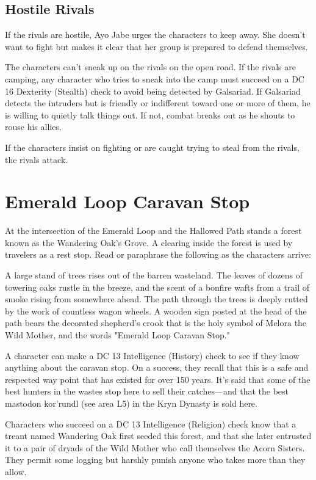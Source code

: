 \documentclass[10pt,a4paper,twoside,bg=print,twocolumn,openany,nodeprecatedcode]{dndbook}
\begin{document}
\subsection{Hostile Rivals}
If the rivals are hostile, Ayo Jabe urges the characters to keep away. She doesn't want to fight but makes it clear that her group is prepared to defend themselves.

The characters can't sneak up on the rivals on the open road. If the rivals are camping, any character who tries to sneak into the camp must succeed on a DC 16 Dexterity (Stealth) check to avoid being detected by Galsariad. If Galsariad detects the intruders but is friendly or indifferent toward one or more of them, he is willing to quietly talk things out. If not, combat breaks out as he shouts to rouse his allies.

If the characters insist on fighting or are caught trying to steal from the rivals, the rivals attack.

\section{Emerald Loop Caravan Stop}
At the intersection of the Emerald Loop and the Hallowed Path stands a forest known as the Wandering Oak's Grove. A clearing inside the forest is used by travelers as a rest stop. Read or paraphrase the following as the characters arrive:

\begin{DndReadAloud}{}
A large stand of trees rises out of the barren wasteland. The leaves of dozens of towering oaks rustle in the breeze, and the scent of a bonfire wafts from a trail of smoke rising from somewhere ahead. The path through the trees is deeply rutted by the work of countless wagon wheels. A wooden sign posted at the head of the path bears the decorated shepherd's crook that is the holy symbol of Melora the Wild Mother, and the words "Emerald Loop Caravan Stop."

\end{DndReadAloud}

A character can make a DC 13 Intelligence (History) check to see if they know anything about the caravan stop. On a success, they recall that this is a safe and respected way point that has existed for over 150 years. It's said that some of the best hunters in the wastes stop here to sell their catches—and that the best mastodon kor'rundl (see area L5) in the Kryn Dynasty is sold here.

Characters who succeed on a DC 13 Intelligence (Religion) check know that a treant named Wandering Oak first seeded this forest, and that she later entrusted it to a pair of dryads of the Wild Mother who call themselves the Acorn Sisters. They permit some logging but harshly punish anyone who takes more than they allow.
\end{document}
